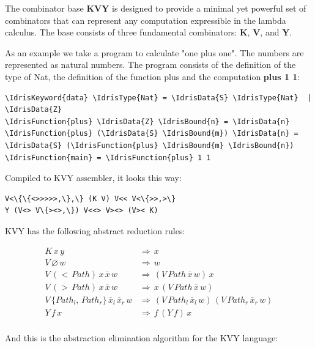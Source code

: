 \documentclass{IEEEtran}
\begin{document}
\par The combinator base \textbf{KVY} is designed to provide a minimal yet powerful set of combinators that can represent any computation expressible in the lambda calculus. The base consists of three fundamental combinators: \textbf{K}, \textbf{V}, and \textbf{Y}.

\par As an example we take a program to calculate "one plus one". The numbers are represented as natural numbers. The program consists of the definition of the type of Nat, the definition of the function plus and the computation \textbf{plus 1 1}:

\begin{Verbatim}
\IdrisKeyword{data} \IdrisType{Nat} = \IdrisData{S} \IdrisType{Nat}  | \IdrisData{Z}
\IdrisFunction{plus} \IdrisData{Z} \IdrisBound{n} = \IdrisData{n}
\IdrisFunction{plus} (\IdrisData{S} \IdrisBound{m}) \IdrisData{n} = \IdrisData{S} (\IdrisFunction{plus} \IdrisBound{m} \IdrisBound{n})
\IdrisFunction{main} = \IdrisFunction{plus} 1 1
\end{Verbatim}

\par Compiled to KVY assembler, it looks this way:

\begin{Verbatim}
V<\{\{<>>>>>,\},\} (K V) V<< V<\{>>,>\}
Y (V<> V\{><>,\}) V<<> V><> (V>< K)
\end{Verbatim}

\par KVY has the following abstract reduction rules:

\begin{align*}
K \, x \, y \, &\Rightarrow \, x \\
V \, \varnothing \, w \, &\Rightarrow \, w \\
V \, ( < \, Path ) \, x \, \overline{x} \, w \, &\Rightarrow \, ( V \, Path \, \overline{x} \, w ) \, x \\
V \, ( > \, Path ) \, x \, \overline{x} \, w \, &\Rightarrow \, x \, ( V \, Path \, \overline{x} \, w ) \\
V \, \{ Path _l , \, Path _r \} \, \overline{x} _l \, \overline{x} _r \, w &\Rightarrow \, ( V \, Path _l \, \overline{x} _l \, w ) \, ( V \, Path _r \, \overline{x} _r \, w ) \\
Y \, f \, x \, &\Rightarrow \, f \, ( Y \, f ) \, x \\
\end{align*}

\par And this is the abstraction elimination algorithm for the KVY language:
\end{document}
